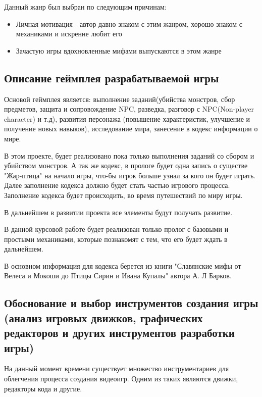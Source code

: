 \documentclass[bachelor, och, coursework, times]{SCWorks}
\begin{document}
    Данный жанр был выбран по следующим причинам:

\begin{itemize}
     
\item Личная мотивация - автор давно знаком с этим жанром, хорошо знаком с механиками
и искренне любит его
\item Зачастую игры вдохновленные мифами выпускаются в этом жанре
\end{itemize}

    \subsection{Описание геймплея разрабатываемой игры}

    Основой геймплея является: выполнение заданий(убийства монстров, сбор предметов,
    защита и сопровождение NPC, разведка, разговор с NPC(Non-player character) и т.д), развития персонажа
    (повышение характеристик, улучшение и получение новых навыков), 
    исследование мира, занесение в кодекс информации о мире.

    В этом проекте, будет реализовано пока только выполнения заданий со сбором и убийством монстров.
    А так же кодекс, в прологе будет одна запись о существе "Жар-птица" на начало игры,
    что-бы игрок больше узнал за кого он будет играть. 
    Далее заполнение кодекса должно будет стать частью игрового процесса.
    Заполнение кодекса будет происходить, во время путешествий по миру игры.
    

    В дальнейшем в развитии проекта все элементы будут получать развитие.

    В данной курсовой работе будет реализован только пролог с базовыми и простыми механиками,
    которые познакомят с тем, что его будет ждать в дальнейшем.

    В основном информация для кодекса берется из книги 
    "Славянские мифы от Велеса и Мокоши до Птицы Сирин и Ивана Купалы" автора А. Л Барков.\cite{slavick}


    \subsection{Обоснование и выбор инструментов создания игры 
    (анализ игровых движков, графических 
    редакторов и других инструментов разработки игры)}

    На данный момент времени существует множество инструментариев для
    облегчения процесса создания видеоигр. Одним из таких являются движки, 
    редакторы кода и другие.
\end{document}
